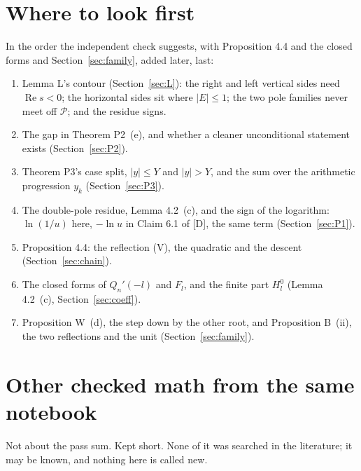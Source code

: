 \documentclass[11pt]{article}
\newcommand{\re}{\operatorname{Re}}
\begin{document}
\section{Where to look first}\label{sec:look}

In the order the independent check suggests, with Proposition 4.4 and the closed forms and Section~\ref{sec:family}, added later, last:
\begin{enumerate}
\item Lemma L's contour (Section~\ref{sec:L}): the right and left vertical sides need $\re s<0$; the horizontal sides sit where $|E|\le1$; the two pole families never meet off $\mathcal{P}$; and the residue signs.
\item The gap in Theorem P2~(e), and whether a cleaner unconditional statement exists (Section~\ref{sec:P2}).
\item Theorem P3's case split, $|y|\le Y$ and $|y|>Y$, and the sum over the arithmetic progression $y_k$ (Section~\ref{sec:P3}).
\item The double-pole residue, Lemma 4.2~(c), and the sign of the logarithm: $\ln(1/u)$ here, $-\ln u$ in Claim 6.1 of [D], the same term (Section~\ref{sec:P1}).
\item Proposition 4.4: the reflection (V), the quadratic and the descent (Section~\ref{sec:chain}).
\item The closed forms of $Q_n'(-l)$ and $F_l$, and the finite part $H^0_l$ (Lemma 4.2~(c), Section~\ref{sec:coeff}).
\item Proposition W~(d), the step down by the other root, and Proposition B~(ii), the two reflections and the unit (Section~\ref{sec:family}).
\end{enumerate}

\appendix
\section{Other checked math from the same notebook}\label{sec:appendix}
\sloppy

Not about the pass sum. Kept short. None of it was searched in the literature; it may be known, and nothing here is called new.
\end{document}
